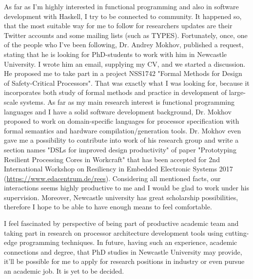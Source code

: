 \documentclass[11pt,a4paper,sans]{moderncv} %
\begin{document}
As far as I'm highly interested in functional programming and also in software 
development with Haskell, I try to be connected to community. It happened so, 
that the most suitable way for me to follow for researchers updates are their 
Twitter accounts and some mailing lists (such as TYPES). Fortunately, once, 
one of the people who I've been following, Dr. Andrey Mokhov, 
published a request, stating that he is looking for PhD-students to work with 
him in Newcastle University. I wrote him an email, 
supplying my CV, and we started a discussion. He proposed me to take part in 
a project NSS1742 "Formal Methods for Design of Safety-Critical Processors". 
That was exactly what I was looking for, because it incorporates both study of 
formal methods and practice in development of large-scale systems. As far as
my main research interest is functional programming languages and I have a solid
software development background, Dr. Mokhov proposed to work on domain-specific
languages for processor specification with formal semantics and hardware
compilation/generation tools. Dr. Mokhov even  gave me a possibility to 
contribute into work of his research group and write a section names 
"DSLs for improved design productivity" of paper "Prototyping Resilient 
Processing Cores in Workcraft" that has been accepted for 2nd International
Workshop on Resiliency in Embedded Electronic Systems 2017 
(\url{https://www.edacentrum.de/rees}). Considering all mentioned facts, our
interactions seems highly productive to me and I would be glad to work under 
his supervision. Moreover, Newcastle university has great scholarship 
possibilities, therefore I hope to be able to have enough means to feel
comfortable. 

I feel fascinated by perspective of being part of productive academic team and
taking part in research on processor architecture development tools 
using cutting-edge programming techniques. In future, having such an experience, 
academic connections and degree, that PhD studies in Newcastle University may 
provide, it'll be possible for me to apply for research positions in industry or
even pursue an academic job. It is yet to be decided.

\makeletterclosing %

\end{document}
